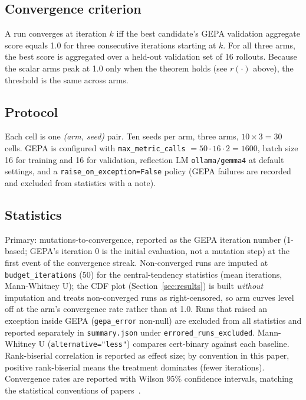 \subsection{Convergence criterion}\label{sec:conv}

A run converges at iteration $k$ iff the best candidate's GEPA
validation aggregate score equals 1.0 for three consecutive
iterations starting at $k$.  For all three arms, the best score
is aggregated over a held-out validation set of 16 rollouts.
Because the scalar arms peak at 1.0 only when the theorem holds
(see $r(\cdot)$ above), the threshold is the same across arms.

\subsection{Protocol}\label{sec:protocol}

Each cell is one \emph{(arm, seed)} pair.  Ten seeds per arm, three
arms, $10 \times 3 = 30$ cells.  GEPA is configured with
\texttt{max\_metric\_calls} $= 50 \cdot 16 \cdot 2 = 1600$, batch
size 16 for training and 16 for validation, reflection LM
\texttt{ollama/gemma4} at default settings, and a
\texttt{raise\_on\_exception=False} policy (GEPA failures are
recorded and excluded from statistics with a note).

\subsection{Statistics}\label{sec:stats}

Primary: mutations-to-convergence, reported as the GEPA
iteration number (1-based; GEPA's iteration 0 is the initial
evaluation, not a mutation step) at the first event of the
convergence streak.  Non-converged runs are imputed at
\texttt{budget\_iterations} (50) for the central-tendency
statistics (mean iterations, Mann-Whitney U); the CDF plot
(Section~\ref{sec:results}) is built \emph{without} imputation and
treats non-converged runs as right-censored, so arm curves level
off at the arm's convergence rate rather than at 1.0.
Runs that raised an exception inside GEPA
(\texttt{gepa\_error} non-null) are excluded from all statistics
and reported separately in \texttt{summary.json} under
\texttt{errored\_runs\_excluded}.  Mann-Whitney U
(\texttt{alternative="less"}) compares cert-binary against each
baseline.  Rank-biserial correlation is reported as effect size;
by convention in this paper, positive rank-biserial means the
treatment dominates (fewer iterations).  Convergence rates are
reported with Wilson 95\% confidence intervals, matching the
statistical conventions of
papers~\cite{banu2026benchmarks,banu2026convergence}.

